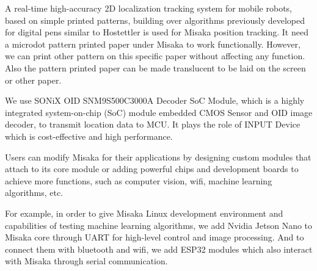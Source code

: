 \documentclass[conference]{IEEEtran}
\begin{document}

A real-time high-accuracy 2D localization tracking system for mobile robots, based on simple printed patterns, building over algorithms previously developed for digital pens similar to Hostettler\cite{hostettler2016real} is used
for Misaka position tracking. It need a microdot pattern printed paper under Misaka to work functionally. However, we can print other pattern on this specific paper without affecting any function. Also the pattern printed paper can be made translucent to be laid on the screen or other paper.

We use SONiX OID SNM9S500C3000A Decoder SoC Module, which is a highly integrated system-on-chip (SoC) module embedded CMOS Sensor and OID image decoder, to transmit location data to MCU. It plays the role of INPUT Device which is cost-effective and high performance.




Users can modify Misaka for their applications by designing custom modules that attach to its core module or adding powerful chips and development boards to achieve more functions, such as computer vision, wifi, machine learning algorithms, etc.

For example, in order to give Misaka Linux development environment and capabilities of testing machine learning algorithms, we add Nvidia Jetson Nano to Misaka core through UART for high-level control and image processing. And to connect them with bluetooth and wifi, we add ESP32 modules which also interact with Misaka through serial communication. 








\end{document}
